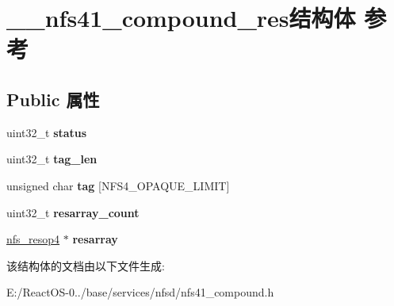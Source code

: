 \hypertarget{struct____nfs41__compound__res}{}\section{\+\_\+\+\_\+nfs41\+\_\+compound\+\_\+res结构体 参考}
\label{struct____nfs41__compound__res}
\subsection*{Public 属性}
\begin{DoxyCompactItemize}
\item 
\mbox{\label{struct____nfs41__compound__res_aa398b325e8668ecdd358b463d6390b49}} 
uint32\+\_\+t {\bfseries status}
\item 
\mbox{\label{struct____nfs41__compound__res_adb351c64ce534f1a97adadcdf7356a37}} 
uint32\+\_\+t {\bfseries tag\+\_\+len}
\item 
\mbox{\label{struct____nfs41__compound__res_a94cb72ce7b838c4e66c98fae7f238092}} 
unsigned char {\bfseries tag} \mbox{[}N\+F\+S4\+\_\+\+O\+P\+A\+Q\+U\+E\+\_\+\+L\+I\+M\+IT\mbox{]}
\item 
\mbox{\label{struct____nfs41__compound__res_afae60ef4df100d34b014ff01735579e4}} 
uint32\+\_\+t {\bfseries resarray\+\_\+count}
\item 
\mbox{\label{struct____nfs41__compound__res_aee75581643498afa500311e7af4d07b1}} 
\hyperlink{struct____nfs__resop4}{nfs\+\_\+resop4} $\ast$ {\bfseries resarray}
\end{DoxyCompactItemize}


该结构体的文档由以下文件生成\+:\begin{DoxyCompactItemize}
\item 
E\+:/\+React\+O\+S-\/0../base/services/nfsd/nfs41\+\_\+compound.\+h\end{DoxyCompactItemize}
